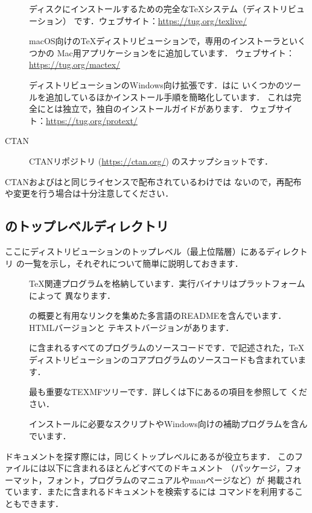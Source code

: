 \documentclass[uplatex,dvipdfmx,tombow]{jsarticle}
\begin{document}
\begin{description}
\item[\TL]
ディスクにインストールするための完全な\TeX システム（ディストリビューション）
です．ウェブサイト：\url{https://tug.org/texlive/}

\item[\MacTeX]
macOS向けの\TeX ディストリビューションで，専用のインストーラといくつかの
Mac用アプリケーションを\TL に追加しています．
ウェブサイト：\url{https://tug.org/mactex/}

\item[\ProTeXt]
\MIKTEX ディストリビューションのWindows向け拡張です．\ProTeXt は\MIKTEX に
いくつかのツールを追加しているほかインストール手順を簡略化しています．
これは完全に\TL とは独立で，独自のインストールガイドがあります．
ウェブサイト：\url{https://tug.org/protext/}

\item[CTAN]
CTANリポジトリ (\url{https://ctan.org/}) のスナップショットです．
\end{description}

CTANおよびは\TL と同じライセンスで配布されているわけでは
ないので，再配布や変更を行う場合は十分注意してください．

\subsection{\TL のトップレベルディレクトリ}
\label{sec:tld}

ここに\TL ディストリビューションのトップレベル（最上位階層）にあるディレクトリ
の一覧を示し，それぞれについて簡単に説明しておきます．
%
\begin{description}
\item[]
\TeX 関連プログラムを格納しています．実行バイナリはプラットフォームによって
異なります．

\item[]
\TL の概要と有用なリンクを集めた多言語のREADMEを含んでいます．HTMLバージョンと
テキストバージョンがあります．

\item[]
\TL に含まれるすべてのプログラムのソースコードです．\Webc で記述された，\TeX
ディストリビューションのコアプログラムのソースコードも含まれています．

\item[]
最も重要なTEXMFツリーです．詳しくは下にあるの項目を参照して
ください．

\item[]
インストールに必要なスクリプトやWindows向けの補助プログラムを含んでいます．
\end{description}
%
ドキュメントを探す際には，同じくトップレベルにあるが役立ちます．
このファイルには以下に含まれるほとんどすべてのドキュメント
（パッケージ，フォーマット，フォント，プログラムのマニュアルやmanページなど）が
掲載されています．また\TL に含まれるドキュメントを検索するには%
コマンドを利用することもできます．
\end{document}
